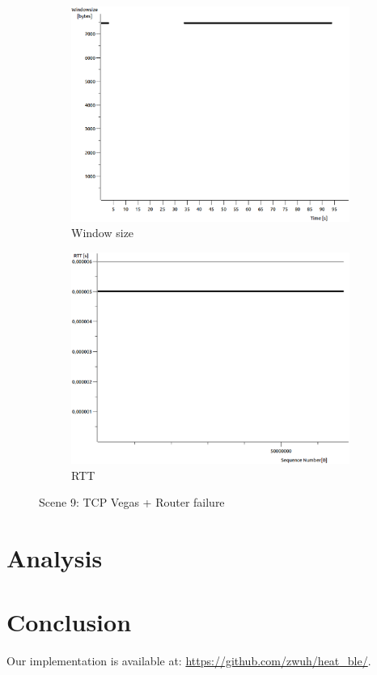 \documentclass[conference,a4paper]{IEEEtran}
\begin{document}
\begin{figure}
\begin{subfigure}[b]{0.2\textwidth}
  \includegraphics[width=\textwidth]{s9-0_wsize}
  \caption{Window size}
 \end{subfigure}
 \begin{subfigure}[b]{0.2\textwidth}
  \includegraphics[width=\textwidth]{s9-0_rtt}
  \caption{RTT}
 \end{subfigure}
 \caption{Scene 9: TCP Vegas + Router failure}
\end{figure}


\section{Analysis}


\section{Conclusion}
Our implementation is available at: \url{https://github.com/zwuh/heat_ble/}.
\end{document}
